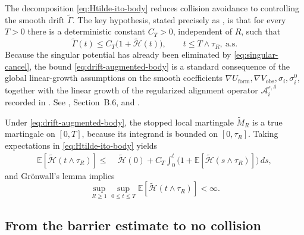 \documentclass[pdflatex,sn-mathphys-num]{sn-jnl}%
\numberwithin{equation}{section}
\theoremstyle{thmstyleone}%
\theoremstyle{remark}
\theoremstyle{definition}
\newcommand{\E}{\mathbb{E}}
\begin{document}
The decomposition \eqref{eq:Htilde-ito-body} reduces collision avoidance to
controlling the smooth drift $\widetilde{\Gamma}$. The key hypothesis,
stated precisely as , is that for every $T>0$ there is
a deterministic constant $C_T>0$, independent of $R$, such that
\begin{equation}\label{eq:drift-augmented-body}
  \widetilde{\Gamma}(t) \le C_T\bigl(1+\widetilde{\mathscr H}(t)\bigr),
  \qquad t\le T\wedge\tau_R,\ \text{a.s.}
\end{equation}
Because the singular potential has already been eliminated by
\eqref{eq:singular-cancel}, the bound \eqref{eq:drift-augmented-body} is a
standard consequence of the global linear-growth assumptions on the smooth
coefficients $\nabla U_{\mathrm{form}},\nabla V_{\mathrm{obs}},\sigma_i,
\sigma_i^0$, together with the linear growth of the regularized alignment
operator $\mathcal A_i^{\varepsilon,\delta}$ recorded in .
See , Section~B.6, and
\cite{mao2007stochastic,khasminskii2011stochastic}.

Under \eqref{eq:drift-augmented-body}, the stopped local martingale
$\widetilde{M}_R$ is a true martingale on $[0,T]$, because its integrand is
bounded on $[0,\tau_R]$. Taking expectations in \eqref{eq:Htilde-ito-body}
yields
\begin{equation}\label{eq:gronwall-input}
\begin{aligned}
  \E[\widetilde{\mathscr H}(t\wedge\tau_R)]
  \le\;& \widetilde{\mathscr H}(0)
        + C_T\int_0^{t}\bigl(1+\E[\widetilde{\mathscr H}(s\wedge\tau_R)]\bigr)\,ds,
\end{aligned}
\end{equation}
and Gr\"onwall's lemma implies
\begin{equation}\label{eq:Htilde-bound}
  \sup_{R\ge 1}\sup_{0\le t\le T}
  \E[\widetilde{\mathscr H}(t\wedge\tau_R)] < \infty.
\end{equation}

\subsection{From the barrier estimate to no collision}
\label{subsec:augmented-no-collision}
\end{document}
